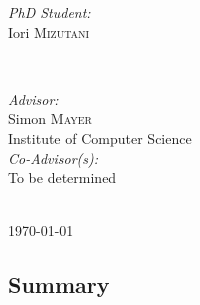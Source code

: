 \documentclass[a4paper,11pt]{article}
\begin{document}
\begin{titlepage}
\begin{minipage}{0.4\textwidth}
\begin{flushleft} \large
\emph{PhD Student:}\\
Iori \textsc{Mizutani} \\ 
\end{flushleft}
\end{minipage}
~
\begin{minipage}{0.5\textwidth}
\begin{flushright} \large
\emph{Advisor:} \\
Simon \textsc{Mayer} \\
Institute of Computer Science\\[0.5cm]
\emph{Co-Advisor(s):} \\
To be determined
\end{flushright}
\end{minipage}\\[2cm]


{\large \today}

\vfill %

\end{titlepage}

\subsection*{Summary}

\lipsum

\newpage









\end{document}
